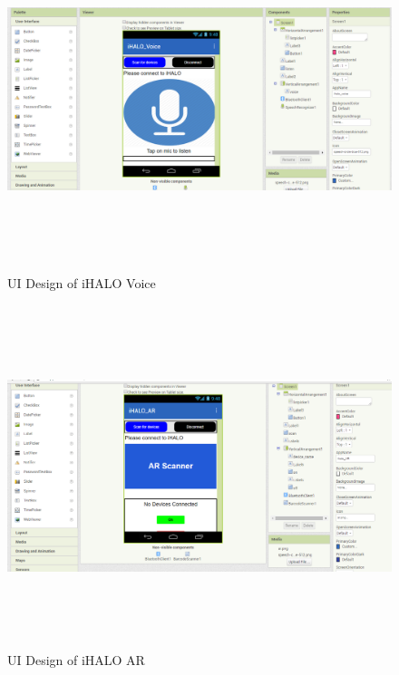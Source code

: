 \begin{figure}[H]
	
	\centering
	\includegraphics[width=\linewidth,height=10cm] {./images/p13.png}
	\caption{UI Design of iHALO Voice}
	\label{manual}
\end{figure}

\begin{figure}[H]
	
	\centering
	\includegraphics[width=\linewidth,height=10cm] {./images/p14.png}
	\caption{UI Design of iHALO AR}
	\label{manual}
\end{figure}\\

